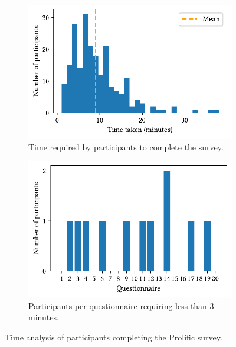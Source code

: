 \documentclass[%
class=scrreprt,
chapterprefix=false,%
open=right,%
twoside=true,%
paper=a4,%
logofile={Logo\_zentral\_farbig\_EN.png},%
thesistype=master,%
UKenglish,%
]{se2thesis}
\theoremstyle{definition}
\begin{document}
	\begin{figure}[tb]
		\centering
		\begin{subfigure}{0.49\textwidth}
			\includegraphics[width=\linewidth]{img/survey_time_histogramm.pdf}
			\caption{Time required by participants to complete the survey.}
			\label{fig:survey_time_histogramm}
		\end{subfigure}
		\hfill
		\begin{subfigure}{0.49\textwidth}
			\includegraphics[width=\linewidth]{img/survey_time_less_than_180.pdf}
			\caption{Participants per questionnaire requiring less than 3 minutes.}
			\label{fig:survey_time_less_than_180}
		\end{subfigure}
		\caption{Time analysis of participants completing the Prolific survey.}
		\label{fig:survey_time_prolific}
	\end{figure}
	
\end{document}
